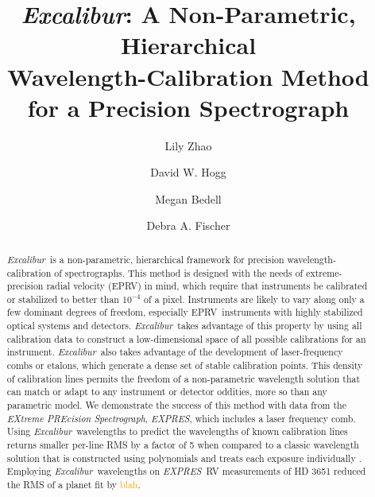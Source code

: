 \documentclass[modern]{aastex63}
\newcommand{\project}[1]{\textsl{#1}}
\newcommand{\name}{\project{Excalibur}}
\newcommand{\acronym}[1]{{\small{#1}}}
\newcommand{\expres}{\project{\acronym{EXPRES}}}
\newcommand{\eprv}{\acronym{EPRV}}
\newcommand{\lz}[1]{\textcolor{orange}{#1}}
\begin{document}
\title{\name:
  A Non-Parametric, Hierarchical \\
  Wavelength-Calibration Method for a Precision Spectrograph}


\author[0000-0002-3852-3590]{Lily Zhao}

\author[0000-0003-2866-9403]{David W. Hogg}

\author[0000-0001-9907-7742]{Megan Bedell}

\author[0000-0003-2221-0861]{Debra A. Fischer}

\begin{abstract}\noindent%
\name\ is a non-parametric, hierarchical framework for precision wavelength-calibration of spectrographs.  This method is designed with the needs of extreme-precision radial velocity (\eprv) in mind, which require that instruments be calibrated or stabilized to better than $10^{-4}$ of a pixel.  Instruments are likely to vary along only a few dominant degrees of freedom, especially \eprv\ instruments with highly stabilized optical systems and detectors.  \name\ takes advantage of this property by using all calibration data to construct a low-dimensional space of all possible calibrations for an instrument.  \name\ also takes advantage of the development of laser-frequency combs or etalons, which generate a dense set of stable calibration points.  This density of calibration lines permits the freedom of a non-parametric wavelength solution that can match or adapt to any instrument or detector oddities, more so than any parametric model.  We demonstrate the success of this method with data from the \textsl{EXtreme PREcision Spectrograph}, \expres, which includes a laser frequency comb.  Using \name\ wavelengths to predict the wavelengths of known calibration lines returns smaller per-line RMS by a factor of 5 when compared to a classic wavelength solution that is constructed using polynomials and treats each exposure individually .  Employing \name\ wavelengths on \expres\ RV measurements of HD 3651 reduced the RMS of a planet fit by \lz{blah}.
\end{abstract}
\end{document}
